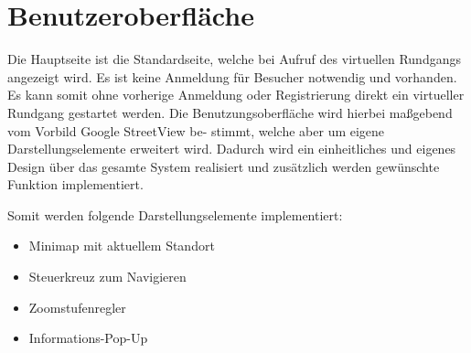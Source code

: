 \section{Benutzeroberfläche}
\label{sec:Benutzeroberflaeche}

Die Hauptseite ist die Standardseite, welche bei Aufruf des virtuellen Rundgangs angezeigt
wird. Es ist keine Anmeldung für Besucher notwendig und vorhanden. Es kann somit ohne
vorherige Anmeldung oder Registrierung direkt ein virtueller Rundgang gestartet werden.
Die Benutzungsoberfläche wird hierbei maßgebend vom Vorbild Google StreetView be-
stimmt, welche aber um eigene Darstellungselemente erweitert wird. Dadurch wird ein
einheitliches und eigenes Design über das gesamte System realisiert und zusätzlich werden
gewünschte Funktion implementiert.

Somit werden folgende Darstellungselemente implementiert:

\begin{itemize}
  \item Minimap mit aktuellem Standort
  \item Steuerkreuz zum Navigieren
  \item Zoomstufenregler
  \item Informations-Pop-Up
\end{itemize}